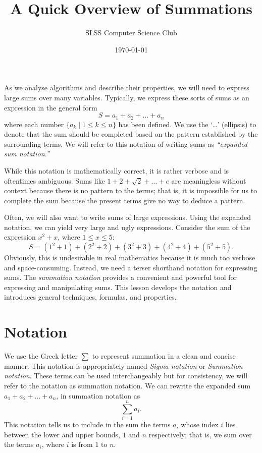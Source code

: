 \documentclass[prereq]{cslesson}
\title{A Quick Overview of Summations}
\author{SLSS Computer Science Club}
\date{\today}
\numberwithin{equation}{section}
\begin{document}
    
\maketitle

\noindent
As we analyse algorithms and describe their properties, we will need to express large sums over many variables. Typically, we express these sorts of sums as an 
expression in the general form
\begin{equation*}
    S=a_1+a_2+\ldots+a_n
    \label{eq:verbose_sum}
\end{equation*}
where each number $\{a_k \mid 1 \leq k \leq n\}$ has been defined. We use the `\ldots' (ellipsis) to denote that the sum should be
completed based on the pattern established by the surrounding terms. We will refer to this notation of writing sums
as \textit{``expanded sum notation.''}
 
While this notation is mathematically correct, it is rather verbose and is oftentimes ambiguous.
Sums like $1+2+\sqrt{2}+\ldots+e$ are meaningless without context because there is no pattern to the terms; that is,
it is impossible for us to complete the sum because the present terms give no way to deduce a pattern.

Often, we will also want to write sums of large expressions. Using the expanded notation, we can yield very large and
ugly expressions. Consider the sum of the expression $x^2+x$, where $1 \leq x \leq 5$:
\begin{equation*}
    S=(1^2+1)+(2^2+2)+(3^2+3)+(4^2+4)+(5^2+5).
\end{equation*}
Obviously, this is undesirable in real mathematics because it is much too verbose and space-consuming.
Instead, we need a terser shorthand notation for expressing sums. The \textit{summation notation} provides a convenient and powerful tool for 
expressing and manipulating sums. This lesson develops the notation and introduces general techniques, formulas, and properties.

\section{Notation}
We use the Greek letter $\sum$ to represent summation in a clean and concise manner. This notation is appropriately named \textit{Sigma-notation} or \textit{Summation notation}. These terms can be used interchangeably but for consistency, we will refer to the notation as summation notation. We can rewrite the expanded sum $a_1+a_2+\ldots+a_n$, in summation notation as
\begin{equation}
    \sum^n_{i=1}a_i.
    \label{eq:first_summation}
\end{equation}
This notation tells us to include in the sum the terms $a_i$ whose index $i$ lies between the lower and upper bounds, $1$ and $n$ respectively; that is, we sum over the terms $a_i$, where $i$ is from $1$ to $n$.
\end{document}
